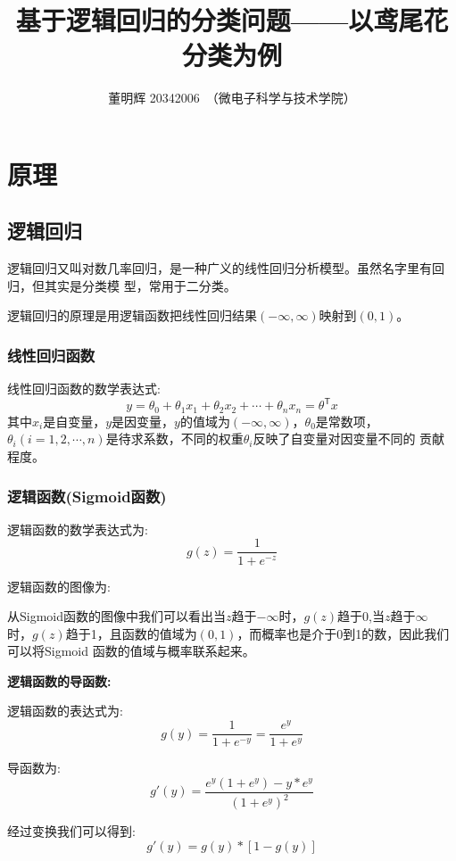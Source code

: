 \documentclass[UTF8]{article}
\title{\textbf{\huge{基于逻辑回归的分类问题——以鸢尾花分类为例}}}
\author{董明辉 20342006\
（微电子科学与技术学院）}
\begin{document}
\maketitle

\newpage
\tableofcontents

\newpage
\section{\textbf{原理}}
\subsection{逻辑回归}
逻辑回归又叫对数几率回归，是一种广义的线性回归分析模型。虽然名字里有回归，但其实是分类模
型，常用于二分类。\par
逻辑回归的原理是用逻辑函数把线性回归结果$(-\infty,\infty)$映射到$(0,1)$。
\subsubsection{线性回归函数}
线性回归函数的数学表达式:
\begin{equation}
	y=\theta_0+\theta_1 x_1+\theta_2 x_2+\cdots+\theta_n x_n=\theta^\mathsf{T} x
	\label{LinearRegression}
\end{equation}
其中$x_i$是自变量，$y$是因变量，$y$的值域为$(-\infty,\infty)$，$\theta_0$是常数项，
$\theta_i(i=1,2,\cdots,n)$是待求系数，不同的权重$\theta_i$反映了自变量对因变量不同的
贡献程度。
\subsubsection{逻辑函数(Sigmoid函数)}
逻辑函数的数学表达式为:
\begin{equation}
	g(z)=\frac{1}{1+e^{-z}}
\end{equation}

逻辑函数的图像为:\par
{}

从Sigmoid函数的图像中我们可以看出当$z$趋于$-\infty$时，$g(z)$趋于0,当$z$趋于$\infty$
时，$g(z)$趋于1，且函数的值域为$(0,1)$，而概率也是介于0到1的数，因此我们可以将Sigmoid
函数的值域与概率联系起来。

\noindent\textbf{逻辑函数的导函数:}\par
逻辑函数的表达式为:
\begin{equation}
	g(y)=\frac{1}{1+e^{-y}}=\frac{e^y}{1+e^y}\label{Sigmoid}
\end{equation}
\par
导函数为:
\begin{equation}
	g'(y)=\frac{e^y(1+e^y)-y*e^y}{(1+e^y)^2}
\end{equation}
\par
经过变换我们可以得到:
\begin{equation}
	g'(y)=g(y)*[1-g(y)]
\end{equation}
\end{document}
